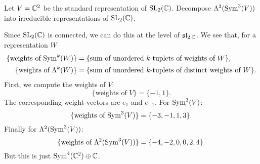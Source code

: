 
\question Let $V = \mathbb C^2$ be the standard representation of $\operatorname{SL}_2(\mathbb C)$. Decompose $\Lambda^2(\operatorname{Sym}^3(V))$ into irreducible representations of $\operatorname{SL}_2(\mathbb C)$.
\begin{solution}
    Since $\operatorname{SL}_2(\mathbb C)$ is connected, we can do this at the level of $\mathfrak{sl}_{2, \mathbb C}$. We see that, for a representation $W$
    \begin{align*}
        \{\text{weights of $\operatorname{Sym}^k(W)$}\}    & = \{\text{sum of unordered $k$-tuplets of weights of $W$}\},          \\
        \{\text{weights of $\Lambda^k(W)$}\} & = \{\text{sum of unordered $k$-tuplets of distinct weights of $W$}\}. \\
    \end{align*}
    First, we compute the weights of $V$:
    \[ \{\text{weights of $V$}\} = \{-1, 1\}. \]
    The corresponding weight vectors are $e_1$ and $e_{-1}$.
    For $\operatorname{Sym}^3(V)$:
    \[ \{\text{weights of $\operatorname{Sym}^3(V)$}\} = \{-3, -1, 1, 3\}. \]
    Finally for $\Lambda^2(\operatorname{Sym}^3(V))$:
    \[ \{\text{weights of $\Lambda^2
                (\operatorname{Sym}^3(V))$}\} = \{-4, -2, 0, 0, 2, 4\}. \]
    But this is just $\operatorname{Sym}^4(\mathbb C^2) \oplus \mathbb C$.
\end{solution}

